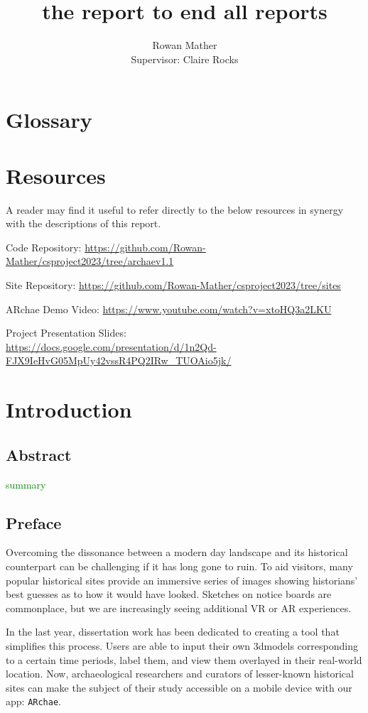 \documentclass{article}
\title{the report to end all reports}
\author{Rowan Mather \\
Supervisor: Claire Rocks}
\date{\parbox{\linewidth}{\centering%
  March 2024 \endgraf\medskip \hspace{1cm} Keywords: Graphics, Unity, Augmented Reality, Education, Mobile, GPS} }
\newcommand{\could}[1]{\textcolor{green}{#1}}
\begin{document}
\maketitle

\tableofcontents

\section{Glossary}

\printglossary

\section{Resources}
A reader may find it useful to refer directly to the below resources in synergy with the descriptions of this report.

Code Repository: \url{https://github.com/Rowan-Mather/csproject2023/tree/archaev1.1} \cite{tools:repo}

Site Repository: \url{https://github.com/Rowan-Mather/csproject2023/tree/sites} \cite{tools:repo}

ARchae Demo Video: \url{https://www.youtube.com/watch?v=xtoHQ3a2LKU} \cite{design:videodemo}

Project Presentation Slides: \\
\url{https://docs.google.com/presentation/d/1n2Qd-FJX9IeHvG05MpUy42vssR4PQ2IRw_TUOAio5jk/}

\section{Introduction}

\subsection{Abstract}
\could{summary}

\subsection{Preface}
Overcoming the dissonance between a modern day landscape and its historical counterpart can be challenging if it has long gone to ruin. To aid visitors, many popular historical sites provide an immersive series of images showing historians' best guesses as to how it would have looked. Sketches on notice boards are commonplace, but we are increasingly seeing additional \gls{VR} or \gls{AR} experiences. 

In the last year, dissertation work has been dedicated 
to creating a tool that simplifies this process. Users are able to input their own \gls{3dmodel}s corresponding to a certain time periods, label them, and view them overlayed in their real-world location. Now, archaeological researchers and curators of lesser-known historical sites can make the subject of their study accessible on a mobile device with our app: 
\verb|ARchae|. 
\end{document}
